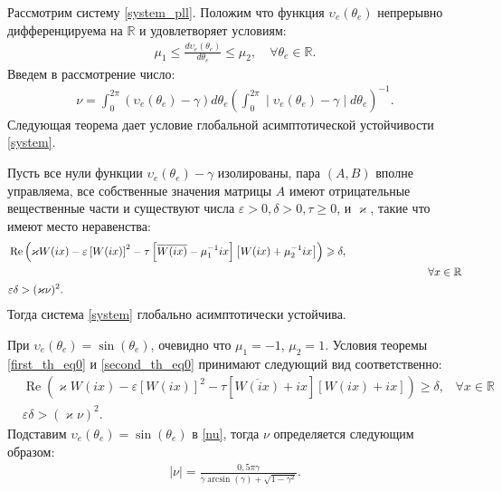 \documentclass[a4paper,article,14pt]{extarticle}
\begin{document}
Рассмотрим систему \eqref{system_pll}. Положим что функция $\upsilon_e(\theta_e)$ непрерывно  дифференцируема на $\mathbb{R}$ и удовлетворяет условиям:
\begin{equation}
 \begin{aligned}
 \mu_1 \leqslant \frac{d \upsilon_e(\theta_e)}{d \theta_e} \leqslant \mu_2, \quad \forall \theta_e \in \mathbb{R}.
 \end{aligned}
\end{equation}
Введем в рассмотрение число:
 \begin{equation}\label{nu}
 \begin{aligned}
\nu = \int_{0}^{2\pi}\left( \upsilon_e(\theta_e) - \gamma \right)d\theta_e \left( \int_{0}^{2\pi} \mid \upsilon_e(\theta_e) - \gamma \mid d\theta_e \right)^{-1}.
 \end{aligned}
\end{equation}
Следующая теорема дает условие глобальной асимптотической устойчивости \eqref{system}.
\begin{theorem}\label{th1}
Пусть все нули функции $\upsilon_e(\theta_e) - \gamma$ изолированы, пара $(A, B)$ вполне управляема, все собственные значения матрицы $A$ имеют отрицательные вещественные части и существуют числа $\varepsilon > 0, \delta > 0, \tau \geqslant 0$, и $\varkappa$, такие что имеют место неравенства:
 \begin{align}
 &\operatorname{Re}\left( \varkappa W(ix)- \varepsilon\left[W(ix)\right]^2-\tau\left[ 	
\overline{W(ix)}-\mu_1^{-1} ix \right]\left[W(ix)+\mu_2^{-1} ix \right]\right) \geqslant \delta, \notag \\
&\hspace{385pt minus 1fil} \forall x \in \mathbb{R} \label{first_th_eq0} \\
&\varepsilon\delta > (\varkappa\nu)^2. \label{second_th_eq0}
 \end{align}
 Тогда система \eqref{system} глобально асимптотически устойчива.
\end{theorem}

При $\upsilon_e(\theta_e) = \operatorname{sin}(\theta_e)$, очевидно что $\mu_1 = -1$, $\mu_2 = 1$. Условия теоремы \eqref{first_th_eq0} и \eqref{second_th_eq0} принимают следующий вид соответственно:
 \begin{align}
&\operatorname{Re}\left( \varkappa W(ix)- \varepsilon\left[W(ix)\right]^2-\tau\left[ \overline{W(ix)}+ix \right]\left[W(ix)+ix \right]\right) \geqslant \delta \text{,} \quad
\forall x \in \mathbb{R} \label{first_th_eq}\\
&\varepsilon\delta > (\varkappa\nu)^2.\label{second_th_eq}
 \end{align}
Подставим $\upsilon_e(\theta_e) = \operatorname{sin}(\theta_e)$ в \eqref{nu}, тогда $\nu$ определяется следующим образом:
 \begin{equation}
 \begin{aligned}
\mid\nu\mid = \frac{0,5\pi\gamma}{\gamma \operatorname{arcsin} (\gamma) + \sqrt{1-\gamma^2}}.
 \end{aligned}
\end{equation}
\end{document}
